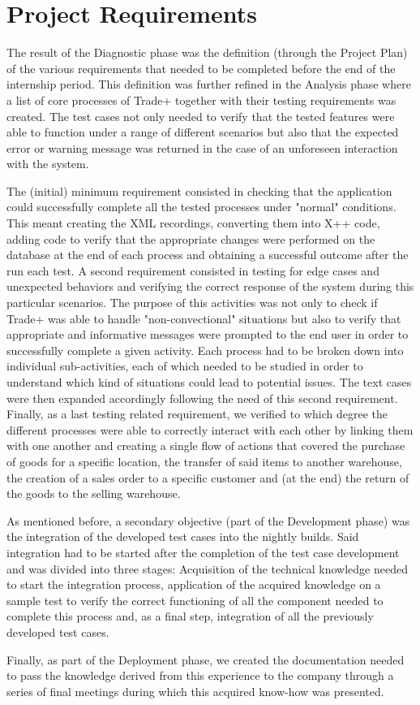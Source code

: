 \chapter{Project Requirements}

The result of the Diagnostic phase was the definition (through the Project Plan) of the various requirements that needed to be completed before the end of the internship period. This definition was further refined in the Analysis phase where a list of core processes of Trade+ together with their testing requirements was created. The test cases not only needed to verify that the tested features were able to function under a range of different scenarios but also that the expected error or warning message was returned in the case of an unforeseen interaction with the system.

The (initial) minimum  requirement consisted in checking that the application could successfully complete all the tested processes under "normal" conditions. This meant creating the XML recordings, converting them into X++ code, adding code to verify that the appropriate changes were performed on the database at the end of each process and obtaining a successful outcome after the run each test. A second requirement consisted in testing for edge cases and unexpected behaviors and verifying the correct response of the system during this particular scenarios. The purpose of this activities was not only to check if Trade+ was able to handle "non-convectional" situations but also to verify that appropriate and informative messages were prompted to the end user in order to successfully complete a given activity. Each process had to be broken down into individual sub-activities, each of which needed to be studied in order to understand which kind of situations could lead to potential issues. The text cases were then expanded accordingly following the need of this second requirement. Finally, as a last testing related requirement, we verified to which degree the different processes were able to correctly interact with each other by linking them with one another and creating a single flow of actions that covered the purchase of goods for a specific location, the transfer of said items to another warehouse, the creation of a sales order to a specific customer and (at the end) the return of the goods to the selling warehouse.

As mentioned before, a secondary objective (part of the Development phase) was the integration of the developed test cases into the nightly builds. Said integration had to be started after the completion of the test case development and was divided into three stages: Acquisition of the technical knowledge needed to start the integration process, application of the acquired knowledge on a sample test to verify the correct functioning of all the component needed to complete this process and, as a final step, integration of all the previously developed test cases.

Finally, as part of the Deployment phase, we created the documentation needed to pass the knowledge derived from this experience to the company through a series of final meetings during which this acquired know-how was presented.
